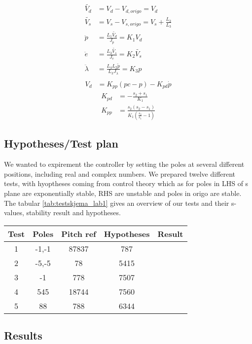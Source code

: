 \begin{subequations}\label{eq:lin_model}
	\begin{align}
        \tilde{V_d} &= V_d-V_{d,origo} = V_d\\
        \tilde{V_s} &= V_s-V_{s,origo} = V_s+\frac{L_2}{L_3}\\
		\ddot{p}  &= \frac{L_1\tilde{V_d}}{J_p} = K_1V_d\label{eq:lin_p} \\
		\ddot{e}  &= \frac{L_3\tilde{V_s}}{J_e} = K_2\tilde{V_s}\label{eq:lin_e} \\
		\ddot{\lambda} &= \frac{L_4L_2\tilde{p}}{L_3J_{\lambda}} = K_3p\label{eq:lin_l} \\
	\end{align}
\end{subequations}
\begin{subequations}\label{eq:PD}
	\begin{align}
        V_d &= K_{pp}(pc-p)-K_{pd}\dot{p}
	\end{align}
\end{subequations}
\begin{subequations}\label{eq:pole_place}
	\begin{align}
    K_{pd} &= -\frac{s_2+s_1}{K_1}\\
    K_{pp} &= \frac{s_2(s_2-s_1)}{K_1(\frac{s_2}{s_1}-1)}
	\end{align}
\end{subequations}

\subsection{Hypotheses/Test plan}
We wanted to expirement the controller by setting the poles at several different positions, including real and complex numbers.
We prepared twelve different tests, with hyoptheses coming from control theory which as for poles in LHS of s plane are exponentially stable, RHS are unstable and poles in origo are stable.
The tabular \ref{tab:testskjema_lab1} gives an overview of our tests and their s-values, stability result and hypotheses.

\begin{center}
    \begin{tabular}{||c c c c c||} 
     \hline
     Test & Poles & Pitch ref & Hypotheses & Result \\ [0.5ex] 
     \hline\hline
     1 & -1,-1 & 87837 & 787 &  \\ 
     \hline
     2 & -5,-5 & 78 & 5415 &  \\
     \hline
     3 & -1  & 778 & 7507 &  \\
     \hline
     4 & 545 & 18744 & 7560 &  \\
     \hline
     5 & 88 & 788 & 6344 &  \\ [1ex] 
     \hline
    \end{tabular}
    \end{center}
\subsection{Results}

\subsection{}

